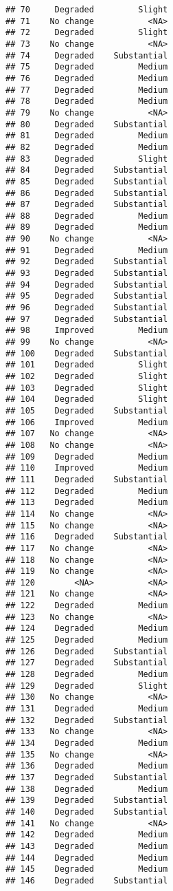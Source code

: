 \documentclass[
]{article}
\begin{document}
\begin{verbatim}
## 70     Degraded         Slight
## 71    No change           <NA>
## 72     Degraded         Slight
## 73    No change           <NA>
## 74     Degraded    Substantial
## 75     Degraded         Medium
## 76     Degraded         Medium
## 77     Degraded         Medium
## 78     Degraded         Medium
## 79    No change           <NA>
## 80     Degraded    Substantial
## 81     Degraded         Medium
## 82     Degraded         Medium
## 83     Degraded         Slight
## 84     Degraded    Substantial
## 85     Degraded    Substantial
## 86     Degraded    Substantial
## 87     Degraded    Substantial
## 88     Degraded         Medium
## 89     Degraded         Medium
## 90    No change           <NA>
## 91     Degraded         Medium
## 92     Degraded    Substantial
## 93     Degraded    Substantial
## 94     Degraded    Substantial
## 95     Degraded    Substantial
## 96     Degraded    Substantial
## 97     Degraded    Substantial
## 98     Improved         Medium
## 99    No change           <NA>
## 100    Degraded    Substantial
## 101    Degraded         Slight
## 102    Degraded         Slight
## 103    Degraded         Slight
## 104    Degraded         Slight
## 105    Degraded    Substantial
## 106    Improved         Medium
## 107   No change           <NA>
## 108   No change           <NA>
## 109    Degraded         Medium
## 110    Improved         Medium
## 111    Degraded    Substantial
## 112    Degraded         Medium
## 113    Degraded         Medium
## 114   No change           <NA>
## 115   No change           <NA>
## 116    Degraded    Substantial
## 117   No change           <NA>
## 118   No change           <NA>
## 119   No change           <NA>
## 120        <NA>           <NA>
## 121   No change           <NA>
## 122    Degraded         Medium
## 123   No change           <NA>
## 124    Degraded         Medium
## 125    Degraded         Medium
## 126    Degraded    Substantial
## 127    Degraded    Substantial
## 128    Degraded         Medium
## 129    Degraded         Slight
## 130   No change           <NA>
## 131    Degraded         Medium
## 132    Degraded    Substantial
## 133   No change           <NA>
## 134    Degraded         Medium
## 135   No change           <NA>
## 136    Degraded         Medium
## 137    Degraded    Substantial
## 138    Degraded         Medium
## 139    Degraded    Substantial
## 140    Degraded    Substantial
## 141   No change           <NA>
## 142    Degraded         Medium
## 143    Degraded         Medium
## 144    Degraded         Medium
## 145    Degraded         Medium
## 146    Degraded    Substantial

\end{verbatim}
\end{document}
